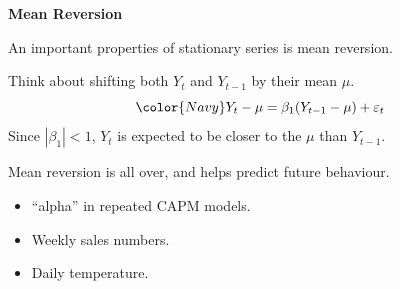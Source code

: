 \documentclass[12pt,xcolor=svgnames]{beamer}
\newcommand{\bk}{\color{black}}
\newcommand{\nv}{\color{Navy}}
\newcommand{\theme}{\color{Maroon}}
\newcommand{\sk}{\vspace{.5cm}}
\begin{document}


\begin{frame}

{\bf Mean Reversion}\sk

An important properties of stationary series is \theme
mean reversion\bk.

\sk
Think about shifting both $Y_t$ and $Y_{t-1}$ by their mean $\mu$.
\[ \nv Y_t - \mu = \beta_1 (Y_{t-1} - \mu) +\varepsilon_t
\]
Since $|\beta_1| < 1$, $Y_t$ is expected to be closer to the $\mu$
than $Y_{t-1}$.

\sk 
Mean reversion is all over, and helps  predict
future behaviour.
\begin{itemize}
\item  ``alpha'' in repeated CAPM models.
\item  Weekly sales numbers.
\item  Daily temperature.
\end{itemize}

\end{frame}
\end{document}
